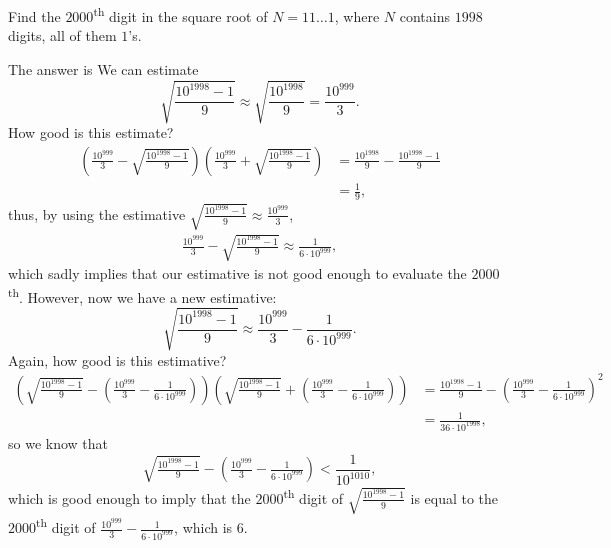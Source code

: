 \begin{prob}{}{}
	Find the $2000$\textsuperscript{th} digit in the square root of $N = 11\dots1$, where $N$ contains $1998$ digits, all of them $1$'s.
\end{prob}

\begin{sol}{}{}
	The answer is 
	We can estimate \[
		\sqrt{\frac{10^{1998} - 1}{9}} \approx \sqrt{\frac{10^{1998}}{9}} = \frac{10^{999}}{3}.
	\]
	How good is this estimate?
	\begin{align*}
		\left(\frac{10^{999}}{3} - \sqrt{\frac{10^{1998} - 1}{9}}\right)
		\left(\frac{10^{999}}{3} + \sqrt{\frac{10^{1998} - 1}{9}}\right) &=
		\frac{10^{1998}}{9} - \frac{10^{1998}-1}{9} \\
		&= \frac{1}{9},
	\end{align*}
	thus, by using the estimative $\sqrt{\frac{10^{1998} - 1}{9}} \approx \frac{10^{999}}{3}$,
	\begin{align*}
		\frac{10^{999}}{3} - \sqrt{\frac{10^{1998} - 1}{9}} \approx \frac{1}{6 \cdot 10^{999}},
	\end{align*}
	which sadly implies that our estimative is not good enough to evaluate the \(2000\)\textsuperscript{th}. However, now we have a new estimative:
	\[
		\sqrt{\frac{10^{1998} - 1}{9}} \approx \frac{10^{999}}{3} - \frac{1}{6 \cdot 10^{999}}.
	\]
	Again, how good is this estimative?
	\begin{align*}
		\left(\sqrt{\tfrac{10^{1998} - 1}{9}} - \left(\tfrac{10^{999}}{3} - \tfrac{1}{6 \cdot 10^{999}}\right)\right)
		\left(\sqrt{\tfrac{10^{1998} - 1}{9}} + \left(\tfrac{10^{999}}{3} - \tfrac{1}{6 \cdot 10^{999}}\right)\right)
		&= 
		\tfrac{10^{1998} - 1}{9} - \left(\tfrac{10^{999}}{3} - \tfrac{1}{6 \cdot 10^{999}}\right)^2 \\
		&= \tfrac{1}{36 \cdot 10^{1998}},
	\end{align*}
	so we know that \[
		\sqrt{\tfrac{10^{1998} - 1}{9}} - \left(\tfrac{10^{999}}{3} - \tfrac{1}{6 \cdot 10^{999}}\right) < \frac{1}{10^{1010}},
	\]
	which is good enough to imply that the \(2000\)\textsuperscript{th} digit of \(\sqrt{\tfrac{10^{1998} - 1}{9}}\) is equal to the \(2000\)\textsuperscript{th} digit of \(\tfrac{10^{999}}{3} - \tfrac{1}{6 \cdot 10^{999}}\), which is \(6\).
\end{sol}
